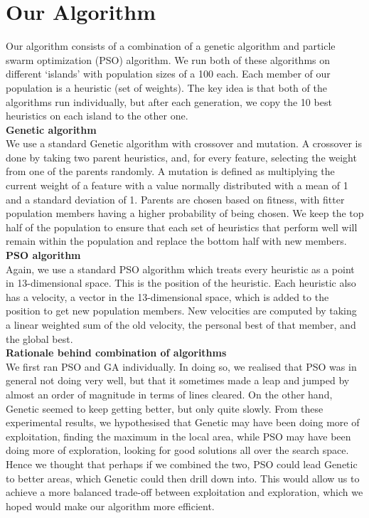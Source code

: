 \documentclass[12pt]{article}
\begin{document}
    \section{Our Algorithm}

    Our algorithm consists of a combination of a genetic algorithm and particle swarm
	optimization (PSO) algorithm. We run both of these algorithms on different ‘islands’
	with population sizes of a 100 each. Each member of our population is a heuristic (set of weights).
	The key idea is that both of the algorithms run individually, but after each generation, we
	copy the 10 best heuristics on each island to the other one.\\

	\textbf{Genetic algorithm}\\
	We use a standard Genetic algorithm with crossover and mutation. A crossover is
	done by taking two parent heuristics, and,
	for every feature, selecting the weight from one of the parents randomly. A
	mutation is defined as multiplying the current weight of a feature with
	a value normally distributed with a mean of 1 and a standard deviation of 1. Parents are chosen based on fitness, with fitter population members having a higher
	probability of being chosen. We keep the top half of the population to ensure that each set of heuristics
	that perform well will remain within the population and replace the bottom half with
	new members.\\

	\textbf{PSO algorithm}\\
	Again, we use a standard PSO algorithm which treats every heuristic as a point in 13-dimensional space.
	This is the position of the heuristic. Each heuristic also has a velocity,
	a vector in the 13-dimensional space, which is added to the position to get
	new population members. New velocities are computed by taking a linear weighted
	sum of the old velocity, the personal best of that member, and the global best.\\

	\textbf{Rationale behind combination of algorithms}\\
	We first ran PSO and GA individually. In doing so, we realised that PSO was in general not doing
	very well, but that it sometimes made a leap and jumped by almost an order of magnitude
	in terms of lines cleared. On the other hand, Genetic seemed to keep getting
	better, but only quite slowly. From these experimental results, we hypothesised
	that Genetic may have been doing more of exploitation, finding the maximum in the local area,
	while PSO may have been doing more of exploration, looking for good solutions all over
	the search space. Hence we thought that perhaps if we combined the two,
	PSO could lead Genetic to better areas, which Genetic could then drill down into.
	This would allow us to achieve a more balanced trade-off between exploitation
	and exploration, which we hoped would make our algorithm more efficient.
\end{document}
